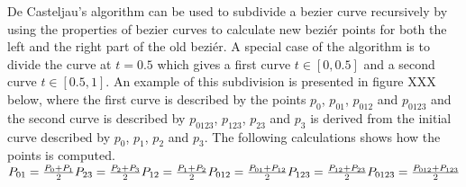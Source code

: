 De Casteljau’s algorithm can be used to subdivide a bezier curve recursively by using the properties of bezier curves to calculate new beziér points for both the left and the right part of the old beziér.\citep{fischer2000} A special case of the algorithm is to divide the curve at \begin{math}t=0.5\end{math} which gives a first curve \begin{math}t\in[0, 0.5]\end{math} and a second curve \begin{math}t\in[0.5, 1]\end{math}. An example of this subdivision is presented in figure XXX below, where the first curve is described by the points \begin{math}p_0\end{math}, \begin{math}p_{01}\end{math}, \begin{math}p_{012}\end{math} and \begin{math}p_{0123}\end{math} and the second curve is described by \begin{math}p_{0123}\end{math}, \begin{math}p_{123}\end{math}, \begin{math}p_{23}\end{math} and \begin{math}p_{3}\end{math} is derived from the initial curve described by \begin{math}p_{0}\end{math}, \begin{math}p_{1}\end{math}, \begin{math}p_{2}\end{math} and \begin{math}p_{3}\end{math}. The following calculations shows how the points is computed.\vspace{\baselineskip}\newline
\begin{math}
	P_{01}=\frac{P_0+P_1}{2}\newline
	P_{23}=\frac{P_2+P_3}{2}\newline
	P_{12}=\frac{P_1+P_2}{2}\newline
	P_{012}=\frac{P_{01}+P_{12}}{2}\newline
	P_{123}=\frac{P_{12}+P_{23}}{2}\newline
	P_{0123}=\frac{P_{012}+P_{123}}{2}
\end{math}\vspace{\baselineskip}\newline


